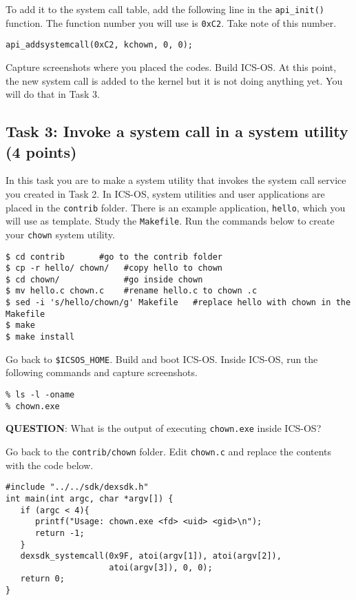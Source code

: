 \documentclass[a4paper, 11pt,oneside]{article}
\begin{document}
To add it to the system call table, add the following line in the 
\texttt{api\_init()} function. The function number you will use is 
\texttt{0xC2}. Take note of this number.

\begin{verbatim}
api_addsystemcall(0xC2, kchown, 0, 0);
\end{verbatim}

Capture screenshots where you placed the codes. 
Build ICS-OS. At this point, the new system call is added to the kernel but it is not 
doing anything yet. You will do that in Task 3. 

\subsection*{Task 3: Invoke a system call in a system utility (4 points)}
In this task you are to make a system utility that invokes the system call service  
you created in Task 2. In ICS-OS, system utilities and user applications are 
placed in the \texttt{contrib} folder. There is an example application, 
\texttt{hello}, which you will use as template. Study the \texttt{Makefile}. 
Run the commands below to create your \texttt{chown} system utility.  

\begin{Verbatim}[frame=single]
$ cd contrib	   #go to the contrib folder
$ cp -r hello/ chown/   #copy hello to chown
$ cd chown/             #go inside chown
$ mv hello.c chown.c    #rename hello.c to chown .c
$ sed -i 's/hello/chown/g' Makefile   #replace hello with chown in the Makefile
$ make
$ make install
\end{Verbatim}

Go back to \texttt{\$ICSOS\_HOME}. Build and boot ICS-OS. 
Inside ICS-OS, run the following commands and capture screenshots.

\begin{Verbatim}[frame=single]
% cd apps
% ls -l -oname
% chown.exe
\end{Verbatim}

\textbf{QUESTION}: What is the output of executing \texttt{chown.exe} inside ICS-OS?

Go back to the \texttt{contrib/chown} folder. Edit \texttt{chown.c} and replace 
the contents with the code below. 

\begin{Verbatim}[frame=single]
#include "../../sdk/dexsdk.h"
int main(int argc, char *argv[]) {
   if (argc < 4){ 
      printf("Usage: chown.exe <fd> <uid> <gid>\n");
      return -1; 
   }   
   dexsdk_systemcall(0x9F, atoi(argv[1]), atoi(argv[2]), 
                     atoi(argv[3]), 0, 0); 
   return 0;
}
\end{Verbatim}
\end{document}
